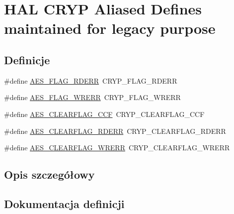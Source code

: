 \hypertarget{group___h_a_l___a_e_s___aliased___defines}{}\section{H\+AL C\+R\+YP Aliased Defines maintained for legacy purpose}
\label{group___h_a_l___a_e_s___aliased___defines}
\subsection*{Definicje}
\begin{DoxyCompactItemize}
\item 
\#define \hyperlink{group___h_a_l___a_e_s___aliased___defines_gaa1ce46da0d4fb33de4f2c64e490cd7d7}{A\+E\+S\+\_\+\+F\+L\+A\+G\+\_\+\+R\+D\+E\+RR}~C\+R\+Y\+P\+\_\+\+F\+L\+A\+G\+\_\+\+R\+D\+E\+RR
\item 
\#define \hyperlink{group___h_a_l___a_e_s___aliased___defines_gac59b45431f2eff8a134d780d9e6b108a}{A\+E\+S\+\_\+\+F\+L\+A\+G\+\_\+\+W\+R\+E\+RR}~C\+R\+Y\+P\+\_\+\+F\+L\+A\+G\+\_\+\+W\+R\+E\+RR
\item 
\#define \hyperlink{group___h_a_l___a_e_s___aliased___defines_gafaf949de7991fdd5029ca6e50e52058b}{A\+E\+S\+\_\+\+C\+L\+E\+A\+R\+F\+L\+A\+G\+\_\+\+C\+CF}~C\+R\+Y\+P\+\_\+\+C\+L\+E\+A\+R\+F\+L\+A\+G\+\_\+\+C\+CF
\item 
\#define \hyperlink{group___h_a_l___a_e_s___aliased___defines_gaa7e307ec1428844c43578317b8978f69}{A\+E\+S\+\_\+\+C\+L\+E\+A\+R\+F\+L\+A\+G\+\_\+\+R\+D\+E\+RR}~C\+R\+Y\+P\+\_\+\+C\+L\+E\+A\+R\+F\+L\+A\+G\+\_\+\+R\+D\+E\+RR
\item 
\#define \hyperlink{group___h_a_l___a_e_s___aliased___defines_gaf098d55b0c28233a8314e3defebc12e6}{A\+E\+S\+\_\+\+C\+L\+E\+A\+R\+F\+L\+A\+G\+\_\+\+W\+R\+E\+RR}~C\+R\+Y\+P\+\_\+\+C\+L\+E\+A\+R\+F\+L\+A\+G\+\_\+\+W\+R\+E\+RR
\end{DoxyCompactItemize}


\subsection{Opis szczegółowy}


\subsection{Dokumentacja definicji}
\mbox{\label{group___h_a_l___a_e_s___aliased___defines_gafaf949de7991fdd5029ca6e50e52058b}} 
